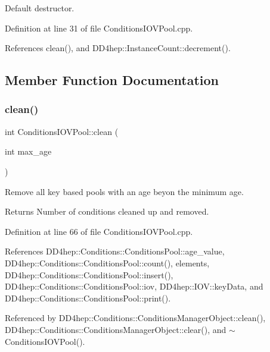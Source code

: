 Default destructor. 



Definition at line 31 of file Conditions\+I\+O\+V\+Pool.\+cpp.



References clean(), and D\+D4hep\+::\+Instance\+Count\+::decrement().



\subsection{Member Function Documentation}
\hypertarget{class_d_d4hep_1_1_conditions_1_1_conditions_i_o_v_pool_a3adc9fa6a89d3195b91b5fb11236f360}{}\label{class_d_d4hep_1_1_conditions_1_1_conditions_i_o_v_pool_a3adc9fa6a89d3195b91b5fb11236f360} 
\subsubsection{\texorpdfstring{clean()}{clean()}}
{\footnotesize\ttfamily int Conditions\+I\+O\+V\+Pool\+::clean (\begin{DoxyParamCaption}\item[{int}]{max\+\_\+age }\end{DoxyParamCaption})}



Remove all key based pools with an age beyon the minimum age. 

\begin{DoxyReturn}{Returns}
Number of conditions cleaned up and removed. 
\end{DoxyReturn}


Definition at line 66 of file Conditions\+I\+O\+V\+Pool.\+cpp.



References D\+D4hep\+::\+Conditions\+::\+Conditions\+Pool\+::age\+\_\+value, D\+D4hep\+::\+Conditions\+::\+Conditions\+Pool\+::count(), elements, D\+D4hep\+::\+Conditions\+::\+Conditions\+Pool\+::insert(), D\+D4hep\+::\+Conditions\+::\+Conditions\+Pool\+::iov, D\+D4hep\+::\+I\+O\+V\+::key\+Data, and D\+D4hep\+::\+Conditions\+::\+Conditions\+Pool\+::print().



Referenced by D\+D4hep\+::\+Conditions\+::\+Conditions\+Manager\+Object\+::clean(), D\+D4hep\+::\+Conditions\+::\+Conditions\+Manager\+Object\+::clear(), and $\sim$\+Conditions\+I\+O\+V\+Pool().

